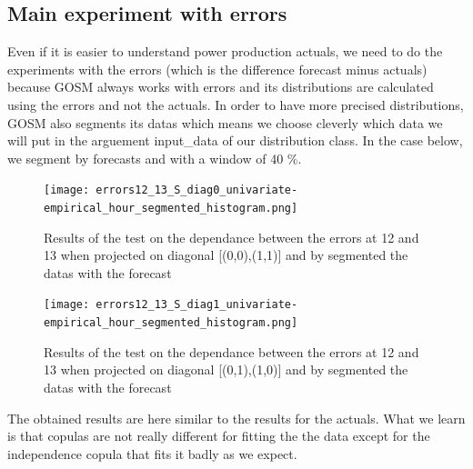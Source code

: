 \documentclass{article}
\begin{document}
\subsection{Main experiment with errors}

Even if it is easier to understand power production actuals, we need to do the experiments with the errors (which is the difference forecast minus actuals) because GOSM always works with errors and its distributions are calculated using the errors and not the actuals. In order to have more precised distributions, GOSM also segments its datas which means we choose cleverly which data we will put in the arguement input\_data of our distribution class. In the case below, we segment by forecasts and with a window of 40 \%.

\begin{figure}[H]
  
    \texttt{[image: errors12\_13\_S\_diag0\_univariate-empirical\_hour\_segmented\_histogram.png]}
    \centering
    \caption{Results of the test on the dependance between the errors at 12 and 13 when projected on diagonal [(0,0),(1,1)] and by segmented the datas with the forecast}
\end{figure}

\begin{figure}[H]
  
    \texttt{[image: errors12\_13\_S\_diag1\_univariate-empirical\_hour\_segmented\_histogram.png]}
    \centering
    \caption{Results of the test on the dependance between the errors at 12 and 13 when projected on diagonal [(0,1),(1,0)] and by segmented the datas with the forecast}
\end{figure}

The obtained results are here similar to the results for the actuals. What we learn is that copulas are not really different for fitting the the data except for the independence copula that fits it badly as we expect.
\end{document}
